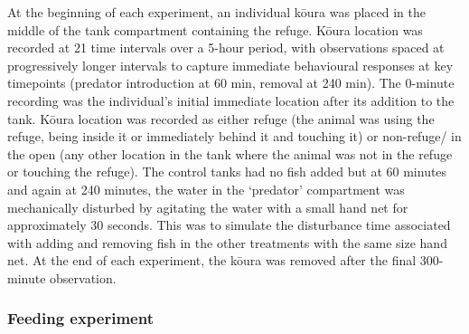 \documentclass[
  letterpaper,
  DIV=11,
  numbers=noendperiod]{scrartcl}
\begin{document}
At the beginning of each experiment, an individual kōura was placed in
the middle of the tank compartment containing the refuge. Kōura location
was recorded at 21 time intervals over a 5-hour period, with
observations spaced at progressively longer intervals to capture
immediate behavioural responses at key timepoints (predator introduction
at 60 min, removal at 240 min). The 0-minute recording was the
individual's initial immediate location after its addition to the tank.
Kōura location was recorded as either refuge (the animal was using the
refuge, being inside it or immediately behind it and touching it) or
non-refuge/ in the open (any other location in the tank where the animal
was not in the refuge or touching the refuge). The control tanks had no
fish added but at 60 minutes and again at 240 minutes, the water in the
`predator' compartment was mechanically disturbed by agitating the water
with a small hand net for approximately 30 seconds. This was to simulate
the disturbance time associated with adding and removing fish in the
other treatments with the same size hand net. At the end of each
experiment, the kōura was removed after the final 300-minute
observation.

\subsubsection{Feeding experiment}\label{feeding-experiment}
\end{document}
